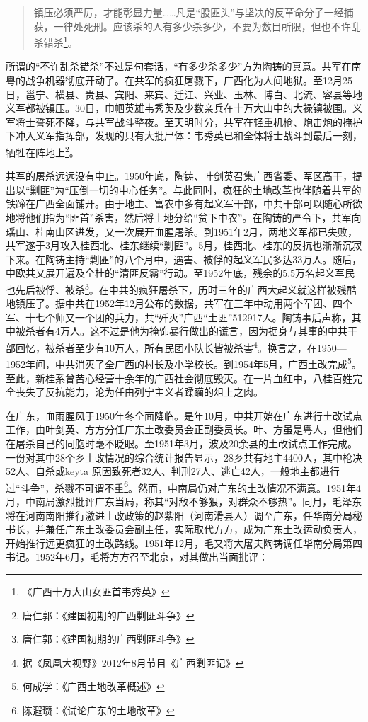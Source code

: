 \begin{quote}

镇压必须严厉，才能彰显力量……凡是“股匪头”与坚决的反革命分子一经捕获，一律处死刑。应该杀的人有多少杀多少，不要为数目所限，但也不许乱杀错杀\footnote{《广西十万大山女匪首韦秀英》}。

\end{quote}

所谓的“不许乱杀错杀”不过是句套话，“有多少杀多少”方为陶铸的真意。共军在南粤的战争机器彻底开动了。在共军的疯狂屠戮下，广西化为人间地狱。至12月25日，邕宁、横县、贵县、宾阳、来宾、迁江、兴业、玉林、博白、北流、容县等地义军都被镇压。30日，巾帼英雄韦秀英及少数亲兵在十万大山中的大禄镇被围。义军将士誓死不降，与共军战斗整夜。至天明时分，共军在轻重机枪、炮击炮的掩护下冲入义军指挥部，发现的只有大批尸体：韦秀英已和全体将士战斗到最后一刻，牺牲在阵地上\footnote{唐仁郭：《建国初期的广西剿匪斗争》}。

共军的屠杀远远没有中止。1950年底，陶铸、叶剑英召集广西省委、军区高干，提出以“剿匪”为“压倒一切的中心任务”。与此同时，疯狂的土地改革也伴随着共军的铁蹄在广西全面铺开。由于地主、富农中多有起义军干部，中共干部可以随心所欲地将他们指为“匪首”杀害，然后将土地分给“贫下中农”。在陶铸的严令下，共军向瑶山、桂南山区进发，又一次展开血腥屠杀。到1951年2月，两地义军都已失败，共军遂于3月攻入桂西北、桂东继续“剿匪”。5月，桂西北、桂东的反抗也渐渐沉寂下来。在陶铸主持“剿匪”的八个月中，遇害、被俘的起义军民多达33万人。随后，中欧共又展开遍及全桂的“清匪反霸”行动。至1952年底，残余的5.5万名起义军民也先后被俘、被杀\footnote{唐仁郭：《建国初期的广西剿匪斗争》}。在中共的疯狂屠杀下，历时三年的广西大起义就这样被残酷地镇压了。据中共在1952年12月公布的数据，共军在三年中动用两个军团、四个军、十七个师又一个团的兵力，共“歼灭”广西“土匪”512917人。陶铸事后声称，其中被杀者有4万人。这不过是他为掩饰暴行做出的谎言，因为据身与其事的中共干部回忆，被杀者至少有10万人，所有民团小队长皆被杀害\footnote{据《凤凰大视野》2012年8月节目《广西剿匪记》}。换言之，在1950—1952年间，中共消灭了全广西的村长及小学校长。到1954年5月，广西土改完成\footnote{何成学：《广西土地改革概述》}。至此，新桂系曾苦心经营十余年的广西社会彻底毁灭。在一片血红中，八桂百姓完全丧失了反抗能力，沦为任由列宁主义者蹂躏的俎上之肉。

在广东，血雨腥风于1950年冬全面降临。是年10月，中共开始在广东进行土改试点工作，由叶剑英、方方分任广东土改委员会正副委员长。叶、方虽是粤人，但他们在屠杀自己的同胞时毫不眨眼。至1951年3月，波及20余县的土改试点工作完成。一份对其中28个乡土改情况的综合统计报告显示，28乡共有地主4400人，其中枪决52人、自杀或keyta 原因致死者32人、判刑27人、逃亡42人，一般地主都进行过“斗争”，杀戮不可谓不重\footnote{陈遐瓒：《试论广东的土地改革》}。然而，中南局仍对广东的土改情况不满意。1951年4月，中南局激烈批评广东当局，称其“对敌不够狠，对群众不够热”。同月，毛泽东将在河南南阳推行激进土改政策的赵紫阳（河南滑县人）调至广东，任华南分局秘书长，并兼任广东土改委员会副主任，实际取代方方，成为广东土改运动负责人，开始推行远更疯狂的土改路线。1951年12月，毛又将大屠夫陶铸调任华南分局第四书记。1952年6月，毛将方方召至北京，对其做出当面批评：


